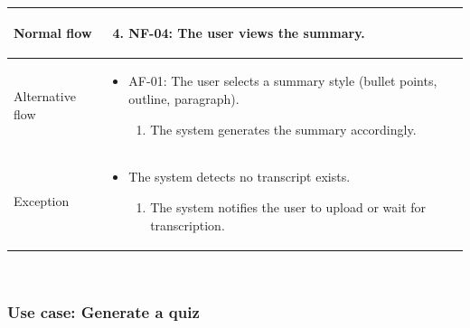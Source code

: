 \begin{table}[H]
    \begin{tabular}{|>{\raggedright\arraybackslash}p{}|>{\raggedright\arraybackslash}p{}|}
        \hline
        Normal flow &
        \begin{enumerate}
            \setcounter{enumi}{3}
            \item NF-04: The user views the summary.
        \end{enumerate} \\
        \hline
        Alternative flow &
        \begin{itemize}
            \item AF-01:  The user selects a summary style (bullet points, outline, paragraph).
            \begin{enumerate}
                \item The system generates the summary accordingly.
            \end{enumerate}
        \end{itemize} \\
        \hline
        Exception &
        \begin{itemize}
            \item The system detects no transcript exists.
            \begin{enumerate}
                \item The system notifies the user to upload or wait for transcription.
            \end{enumerate}
        \end{itemize}\\
        \hline
    \end{tabular}
\end{table}\\

\subsubsection{Use case: Generate a quiz}
\newpage


